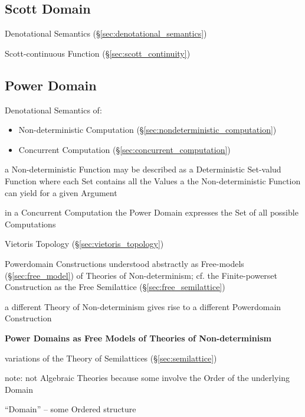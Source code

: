 \subsection{Scott Domain}\label{sec:scott_domain}

Denotational Semantics (\S\ref{sec:denotational_semantics})

Scott-continuous Function (\S\ref{sec:scott_continuity})



\subsection{Power Domain}\label{sec:power_domain}

Denotational Semantics of:
\begin{itemize}
  \item Non-deterministic Computation
    (\S\ref{sec:nondeterministic_computation})
  \item Concurrent Computation (\S\ref{sec:concurrent_computation})
\end{itemize}

a Non-deterministic Function may be described as a Deterministic
Set-valud Function where each Set contains all the Values a the
Non-deterministic Function can yield for a given Argument

in a Concurrent Computation the Power Domain expresses the Set of all
possible Computations

\fist Vietoris Topology (\S\ref{sec:vietoris_topology})

Powerdomain Constructions understood abstractly as Free-models
(\S\ref{sec:free_model}) of Theories of Non-determinism; cf. the
Finite-powerset Construction as the Free Semilattice
(\S\ref{sec:free_semilattice})

a different Theory of Non-determinism gives rise to a different
Powerdomain Construction


\textbf{Power Domains as Free Models of Theories of Non-determinism}

variations of the Theory of Semilattices (\S\ref{sec:semilattice})

\fist note: not Algebraic Theories because some involve the Order of
the underlying Domain %

``Domain'' -- some Ordered structure

